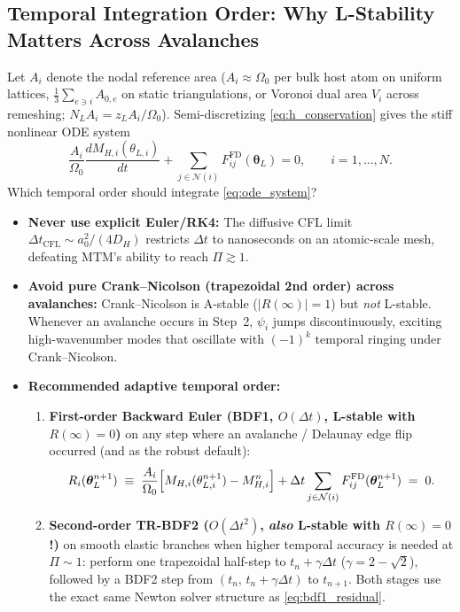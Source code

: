 \documentclass[11pt,a4paper]{article}
\begin{document}
\subsection{Temporal Integration Order: Why L-Stability Matters Across Avalanches}

Let $A_i$ denote the nodal reference area ($A_i \approx \Omega_0$ per bulk host atom on uniform lattices, $\frac{1}{3}\sum_{e \ni i} A_{0,e}$ on static triangulations, or Voronoi dual area $V_i$ across remeshing; $N_L A_i = z_L A_i / \Omega_0$). Semi-discretizing \eqref{eq:h_conservation} gives the stiff nonlinear ODE system
\begin{equation}
  \frac{A_i}{\Omega_0}\frac{d M_{H,i}(\theta_{L,i})}{dt} + \sum_{j \in \mathcal{N}(i)} F_{ij}^{\text{FD}}(\boldsymbol{\theta}_L) = 0,
  \qquad i = 1, \dots, N.
  \label{eq:ode_system}
\end{equation}
Which temporal order should integrate \eqref{eq:ode_system}?
\begin{itemize}[nosep]
  \item \textbf{Never use explicit Euler/RK4:} The diffusive CFL limit $\Delta t_{\text{CFL}} \sim a_0^2 / (4 D_H)$ restricts $\Delta t$ to nanoseconds on an atomic-scale mesh, defeating MTM's ability to reach $\Pi \gtrsim 1$.
  \item \textbf{Avoid pure Crank--Nicolson (trapezoidal 2nd order) across avalanches:} Crank--Nicolson is A-stable ($|R(\infty)| = 1$) but \emph{not} L-stable. Whenever an avalanche occurs in Step~2, $\psi_i$ jumps discontinuously, exciting high-wavenumber modes that oscillate with $(-1)^k$ temporal ringing under Crank--Nicolson.
  \item \textbf{Recommended adaptive temporal order:}
  \begin{enumerate}[nosep]
    \item \textbf{First-order Backward Euler (BDF1, $O(\Delta t)$, L-stable with $R(\infty)=0$)} on any step where an avalanche / Delaunay edge flip occurred (and as the robust default):
    \begin{equation}
      R_i(\boldsymbol{\theta}_L^{n+1}) \;\equiv\;
      \frac{A_i}{\Omega_0}\Bigl[M_{H,i}(\theta_{L,i}^{n+1}) - M_{H,i}^n\Bigr]
      + \Delta t \sum_{j \in \mathcal{N}(i)} F_{ij}^{\text{FD}}(\boldsymbol{\theta}_L^{n+1}) \;=\; 0.
      \label{eq:bdf1_residual}
    \end{equation}
    \item \textbf{Second-order TR-BDF2 ($O(\Delta t^2)$, \emph{also} L-stable with $R(\infty)=0$!)} on smooth elastic branches when higher temporal accuracy is needed at $\Pi \sim 1$: perform one trapezoidal half-step to $t_n + \gamma\Delta t$ ($\gamma = 2 - \sqrt{2}$), followed by a BDF2 step from $(t_n,\, t_n + \gamma\Delta t)$ to $t_{n+1}$. Both stages use the exact same Newton solver structure as \eqref{eq:bdf1_residual}.
  \end{enumerate}
\end{itemize}
\end{document}
